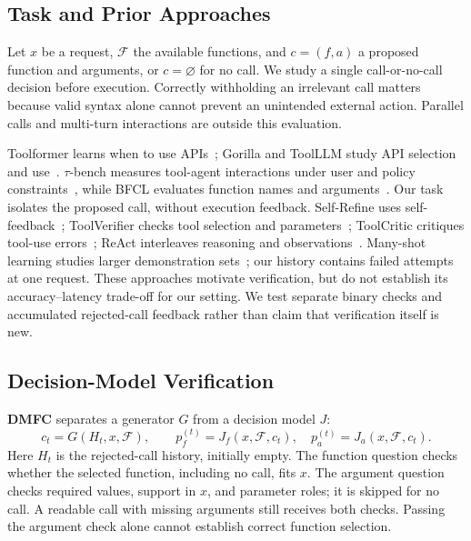 \subsection{Task and Prior Approaches}
Let $x$ be a request, $\mathcal{F}$ the available functions, and $c=(f,a)$ a proposed function and arguments, or $c=\varnothing$ for no call. We study a single call-or-no-call decision before execution. Correctly withholding an irrelevant call matters because valid syntax alone cannot prevent an unintended external action. Parallel calls and multi-turn interactions are outside this evaluation.

Toolformer learns when to use APIs~\cite{schick2023toolformer}; Gorilla and ToolLLM study API selection and use~\cite{patil2024gorilla,qin2024toolllm}. $\tau$-bench measures tool-agent interactions under user and policy constraints~\cite{yao2024taubench}, while BFCL evaluates function names and arguments~\cite{patil2025bfcl}. Our task isolates the proposed call, without execution feedback. Self-Refine uses self-feedback~\cite{madaan2023selfrefine}; ToolVerifier checks tool selection and parameters~\cite{mekala2024toolverifier}; ToolCritic critiques tool-use errors~\cite{hamad2025toolcritic}; ReAct interleaves reasoning and observations~\cite{yao2023react}. Many-shot learning studies larger demonstration sets~\cite{agarwal2024manyshot}; our history contains failed attempts at one request. These approaches motivate verification, but do not establish its accuracy--latency trade-off for our setting. We test separate binary checks and accumulated rejected-call feedback rather than claim that verification itself is new.

\subsection{Decision-Model Verification}
\textbf{DMFC} separates a generator $G$ from a decision model $J$:
\begin{equation}
c_t=G(H_t,x,\mathcal{F}),\qquad
p_f^{(t)}=J_f(x,\mathcal{F},c_t),\quad
p_a^{(t)}=J_a(x,\mathcal{F},c_t).
\end{equation}
Here $H_t$ is the rejected-call history, initially empty. The function question checks whether the selected function, including no call, fits $x$. The argument question checks required values, support in $x$, and parameter roles; it is skipped for no call. A readable call with missing arguments still receives both checks. Passing the argument check alone cannot establish correct function selection.

